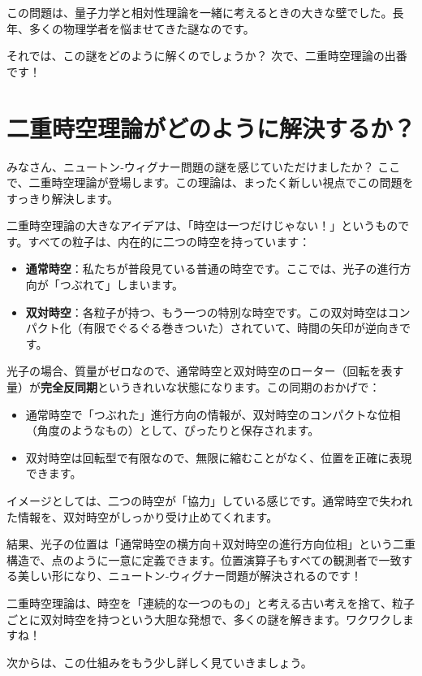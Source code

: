 \documentclass[dvipdfmx,12pt,a4paper]{article}
\begin{document}
この問題は、量子力学と相対性理論を一緒に考えるときの大きな壁でした。長年、多くの物理学者を悩ませてきた謎なのです。

それでは、この謎をどのように解くのでしょうか？ 次で、二重時空理論の出番です！

\section{二重時空理論がどのように解決するか？}

みなさん、ニュートン‐ウィグナー問題の謎を感じていただけましたか？ ここで、二重時空理論が登場します。この理論は、まったく新しい視点でこの問題をすっきり解決します。

二重時空理論の大きなアイデアは、「時空は一つだけじゃない！」というものです。すべての粒子は、内在的に二つの時空を持っています：
\begin{itemize}
  \item \textbf{通常時空}：私たちが普段見ている普通の時空です。ここでは、光子の進行方向が「つぶれて」しまいます。
  \item \textbf{双対時空}：各粒子が持つ、もう一つの特別な時空です。この双対時空はコンパクト化（有限でぐるぐる巻きついた）されていて、時間の矢印が逆向きです。
\end{itemize}

光子の場合、質量がゼロなので、通常時空と双対時空のローター（回転を表す量）が\textbf{完全反同期}というきれいな状態になります。この同期のおかげで：
\begin{itemize}
  \item 通常時空で「つぶれた」進行方向の情報が、双対時空のコンパクトな位相（角度のようなもの）として、ぴったりと保存されます。
  \item 双対時空は回転型で有限なので、無限に縮むことがなく、位置を正確に表現できます。
\end{itemize}

イメージとしては、二つの時空が「協力」している感じです。通常時空で失われた情報を、双対時空がしっかり受け止めてくれます。

結果、光子の位置は「通常時空の横方向＋双対時空の進行方向位相」という二重構造で、点のように一意に定義できます。位置演算子もすべての観測者で一致する美しい形になり、ニュートン‐ウィグナー問題が解決されるのです！

二重時空理論は、時空を「連続的な一つのもの」と考える古い考えを捨て、粒子ごとに双対時空を持つという大胆な発想で、多くの謎を解きます。ワクワクしますね！

次からは、この仕組みをもう少し詳しく見ていきましょう。
\end{document}
